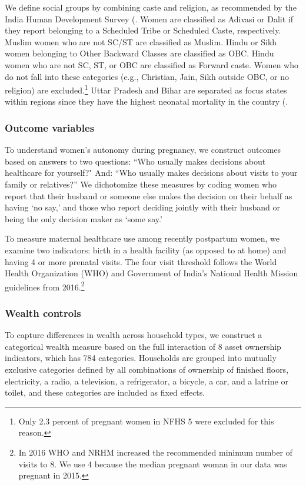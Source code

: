 \documentclass[12pt]{article}
\begin{document}
We define social groups by combining caste and religion, as recommended by the India Human Development Survey (\cite{desai2008india}. Women are classified as Adivasi or Dalit if they report belonging to a Scheduled Tribe or Scheduled Caste, respectively. Muslim women who are not SC/ST are classified as Muslim. Hindu or Sikh women belonging to Other Backward Classes are classified as OBC. Hindu women who are not SC, ST, or OBC are classified as Forward caste. Women who do not fall into these categories (e.g., Christian, Jain, Sikh outside OBC, or no religion) are excluded.\footnote{Only 2.3 percent of pregnant women in NFHS 5 were excluded for this reason.} Uttar Pradesh and Bihar are separated as focus states within regions since they have the highest neonatal mortality in the country (\cite{coffey2025excess}. 

\subsubsection{Outcome variables} \label{sec:outcomes}
To understand women's autonomy during pregnancy, we construct outcomes based on answers to two questions: ``Who usually makes decisions about healthcare for yourself?"  And: ``Who usually makes decisions about visits to your family or relatives?'' We dichotomize these measures by coding women who report that their husband or someone else makes the decision on their behalf as having ‘no say,’ and those who report deciding jointly with their husband or being the only decision maker as ‘some say.’

To measure maternal healthcare use among recently postpartum women, we examine two indicators: birth in a health facility (as opposed to at home) and having 4 or more prenatal visits. The four visit threshold follows the World Health Organization (WHO) and Government of India’s National Health Mission guidelines from 2016.\footnote{In 2016 WHO and NRHM increased the recommended minimum number of visits to 8.  We use 4 because the median pregnant woman in our data was pregnant in 2015.}

\subsubsection{Wealth controls} \label{sec:wealthcontrols}

To capture differences in wealth across household types, we construct a categorical wealth measure based on the full interaction of 8 asset ownership indicators, which has 784 categories. Households are grouped into mutually exclusive categories defined by all combinations of ownership of finished floors, electricity, a radio, a television, a refrigerator, a bicycle, a car, and a latrine or toilet, and these categories are included as fixed effects.
\end{document}
